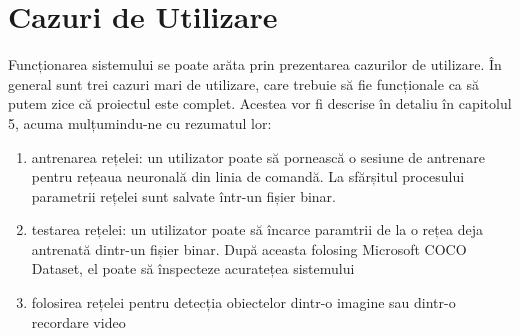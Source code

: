 \section{Cazuri de Utilizare}
Funcționarea sistemului se poate arăta prin prezentarea cazurilor de utilizare.\newline
În general sunt trei cazuri mari de utilizare, care trebuie să fie funcționale ca să putem zice că proiectul este complet. Acestea vor fi descrise în detaliu în capitolul 5, acuma mulțumindu-ne cu rezumatul lor:
\begin{enumerate}
	\item antrenarea rețelei: un utilizator poate să pornească o sesiune de antrenare pentru rețeaua neuronală din linia de comandă. La sfărșitul procesului parametrii rețelei sunt salvate într-un fișier binar.
	\item testarea rețelei: un utilizator poate să încarce paramtrii de la o rețea deja antrenată dintr-un fișier binar. După aceasta folosing Microsoft COCO Dataset, el poate să înspecteze acuratețea sistemului
	\item folosirea rețelei pentru detecția obiectelor dintr-o imagine sau dintr-o recordare video
\end{enumerate}